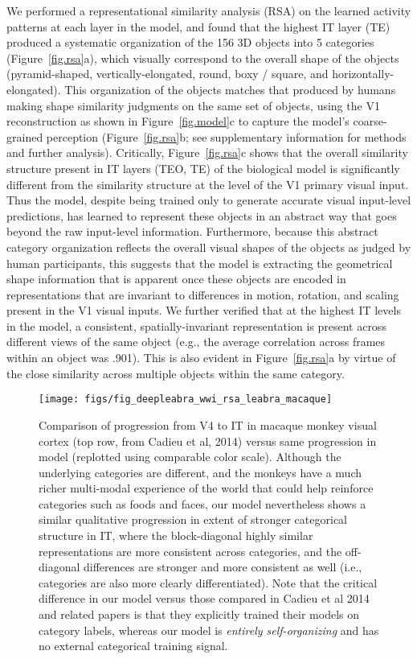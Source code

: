 \documentclass[12pt,twoside]{nature}
\newif\myifpdf
\begin{document}
We performed a representational similarity analysis (RSA) on the learned activity patterns at each layer in the model, and found that the highest IT layer (TE) produced a systematic organization of the 156 3D objects into 5 categories (Figure~\ref{fig.rsa}a), which visually correspond to the overall shape of the objects (pyramid-shaped, vertically-elongated, round, boxy / square, and horizontally-elongated). This organization of the objects matches that produced by humans making shape similarity judgments on the same set of objects, using the V1 reconstruction as shown in Figure~\ref{fig.model}c to capture the model's coarse-grained perception (Figure~\ref{fig.rsa}b; see supplementary information for methods and further analysis).  Critically, Figure~\ref{fig.rsa}c shows that the overall similarity structure present in IT layers (TEO, TE) of the biological model is significantly different from the similarity structure at the level of the V1 primary visual input.  Thus the model, despite being trained only to generate accurate visual input-level predictions, has learned to represent these objects in an abstract way that goes beyond the raw input-level information.  Furthermore, because this abstract category organization reflects the overall visual shapes of the objects as judged by human participants, this suggests that the model is extracting the geometrical shape information that is apparent once these objects are encoded in representations that are  invariant to differences in motion, rotation, and scaling present in the V1 visual inputs.  We further verified that at the highest IT levels in the model, a consistent, spatially-invariant representation is present across different views of the same object (e.g., the average correlation across frames within an object was .901).  This is also evident in Figure~\ref{fig.rsa}a by virtue of the close similarity across multiple objects within the same category.

\begin{figure}
  \centering\texttt{[image: figs/fig\_deepleabra\_wwi\_rsa\_leabra\_macaque]}
  \caption{\small Comparison of progression from V4 to IT in macaque monkey visual cortex (top row, from Cadieu et al, 2014) versus same progression in model (replotted using comparable color scale).  Although the underlying categories are different, and the monkeys have a much richer multi-modal experience of the world that could help reinforce categories such as foods and faces, our model nevertheless shows a similar qualitative progression in extent of stronger categorical structure in IT, where the block-diagonal highly similar representations are more consistent across categories, and the off-diagonal differences are stronger and more consistent as well (i.e., categories are also more clearly differentiated).  Note that the critical difference in our model versus those compared in Cadieu et al 2014 and related papers is that they explicitly trained their models on category labels, whereas our model is {\em entirely self-organizing} and has no external categorical training signal.}
  \label{fig.macaque}
\end{figure}
\end{document}

